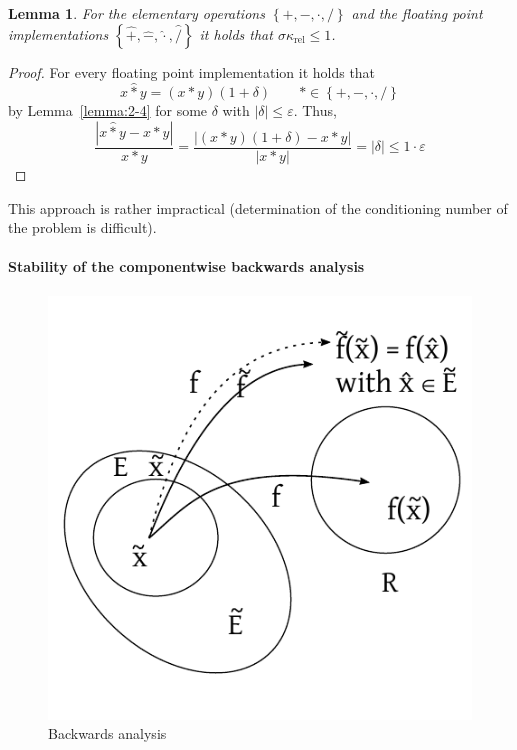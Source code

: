\documentclass[a4paper]{article}
\newcounter{lecref}[section]
\numberwithin{lecref}{section}
\theoremstyle{break}
\newtheorem{lemma}[lecref]{Lemma}
\newcommand{\Abs}[1]{\left|#1\right|}
\newcommand{\Set}[1]{\left\{#1\right\}}
\begin{document}
\begin{lemma}
  For the elementary operations $\Set{+, -, \cdot, /}$ and the floating point implementations $\Set{\hat{+}, \hat{-}, \hat{\cdot}, \hat{/}}$ it holds that $\sigma \kappa_{\operatorname{rel}} \leq 1$.
\end{lemma}
\begin{proof}
  For every floating point implementation it holds that
  \[ x \hat{*} y = (x * y)(1 + \delta) \qquad * \in \Set{+, -, \cdot, /} \]
  by Lemma~\ref{lemma:2-4} for some $\delta$ with $\Abs{\delta} \leq \varepsilon$.
  Thus,
  \[ \frac{\Abs{x \hat{*} y - x * y}}{x * y} = \frac{\Abs{(x * y)(1 + \delta) - x * y}}{\Abs{x * y}} = \Abs{\delta} \leq 1 \cdot \varepsilon \]
\end{proof}

This approach is rather impractical (determination of the conditioning number of the problem is difficult).

\paragraph{Stability of the componentwise backwards analysis}

\begin{figure}[!ht]
  \begin{center}
    \includegraphics{img/backwards-analysis.pdf}
    \caption{Backwards analysis}
    \label{img:backwards-analysis}
  \end{center}
\end{figure}
\end{document}

